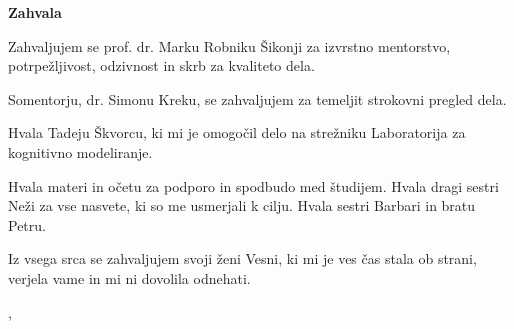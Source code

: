 \thispagestyle{empty}

\begin{center}
{\Large \textbf{\sc Zahvala}}
\end{center}
\vspace{0.5cm}

{\it\noindent

Zahvaljujem se prof. dr. Marku Robniku Šikonji za izvrstno mentorstvo, potrpežljivost, odzivnost in skrb za kvaliteto dela.

Somentorju, dr. Simonu Kreku, se zahvaljujem za temeljit strokovni pregled dela.

Hvala Tadeju Škvorcu, ki mi je omogočil delo na strežniku Laboratorija za kognitivno modeliranje.

Hvala materi in očetu za podporo in spodbudo med študijem. Hvala dragi sestri Neži za vse nasvete, ki so me usmerjali k cilju. Hvala sestri Barbari in bratu Petru.

Iz vsega srca se zahvaljujem svoji ženi Vesni, ki mi je ves čas stala ob strani, verjela vame in mi ni dovolila odnehati.

\vspace{0.5cm} \hfill \tauthor, \myyear
}

